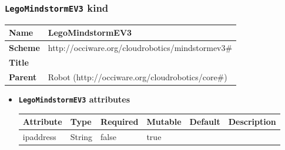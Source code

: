 \subsubsection{\texttt{LegoMindstormEV3} kind}
\begin{center}
\begin{tabular}{|l|l|}
  \hline
  \textbf{Name} & LegoMindstormEV3 \\
  \hline  
  \textbf{Scheme} & http://occiware.org/cloudrobotics/mindstormev3\# \\
  \hline
  \textbf{Title} &  \\
  \hline
  \textbf{Parent} & Robot (http://occiware.org/cloudrobotics/core\#) \\
  \hline
\end{tabular}
\end{center}
\begin{itemize}
\item \textbf{\texttt{LegoMindstormEV3} attributes}

\begin{tabularx}{\textwidth}{|l|l|p{1.4cm}|p{1.3cm}|l|X|}
  \hline
  \textbf{Attribute} & \textbf{Type} & \textbf{Required} & \textbf{Mutable} & \textbf{Default} & \textbf{Description} \\
  \hline  
  ipaddress & String & false & true &  &  \\
  \hline
\end{tabularx}
\end{itemize}



